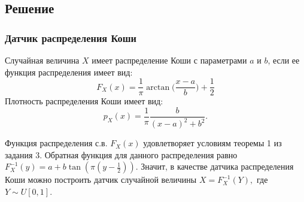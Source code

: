 \documentclass[11pt]{article}
\begin{document}
\subsection{Решение}
\subsubsection{Датчик распределения Коши}
\begin{opr}
	Случайная величина $X$ имеет распределение Коши с параметрами $a$ и $b$, если ее функция распределения имеет вид:
	\[ F_X(x) = \frac{1}{\pi}\arctan\bigg(\frac{x - a}{b}\bigg) + \frac{1}{2} \]
	Плотность распределения Коши имеет вид:
	\[ p_X(x) = \frac{1}{\pi} \frac{b}{(x - a)^2 + b^2}. \]
\end{opr}
Функция распределения с.в. $F_X(x)$ удовлетворяет условиям теоремы 1 из задания 3. Обратная функция для данного распределения равно $F^{-1}_X(y) = a + b\tan(\pi(y - \frac{1}{2}))$. Значит, в качестве датчика распределения Коши можно построить датчик случайной величины $X = F^{-1}_X(Y),$ где $Y \sim U[0,1].$
\end{document}
